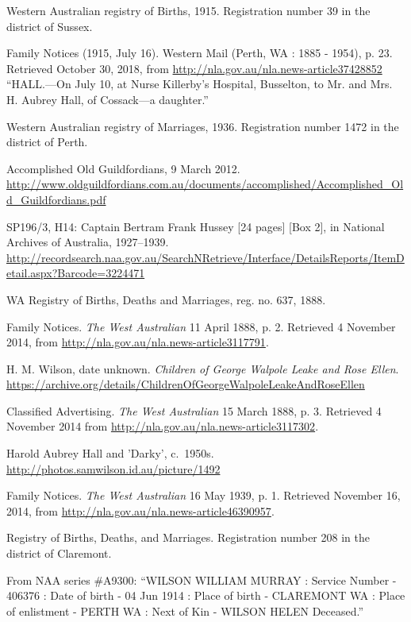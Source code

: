 \begin{thebibliography}{999}
	Western Australian registry of Births, 1915. Registration number 39 in the district of Sussex.

	Family Notices (1915, July 16). Western Mail (Perth, WA : 1885 - 1954), p. 23. Retrieved October 30, 2018, from \url{http://nla.gov.au/nla.news-article37428852}
	``HALL.---On July 10, at Nurse Killerby's Hospital, Busselton, to Mr. and Mrs. H. Aubrey Hall, of Cossack---a daughter.''

	Western Australian registry of Marriages, 1936. Registration number 1472 in the district of Perth.

	Accomplished Old Guildfordians, 9 March 2012.
	\url{http://www.oldguildfordians.com.au/documents/accomplished/Accomplished_Old_Guildfordians.pdf}

	SP196/3, H14: Captain Bertram Frank Hussey [24 pages] [Box 2], in National Archives of Australia, 1927--1939.
	\url{http://recordsearch.naa.gov.au/SearchNRetrieve/Interface/DetailsReports/ItemDetail.aspx?Barcode=3224471}

	WA Registry of Births, Deaths and Marriages, reg. no. 637, 1888.

	Family Notices. \emph{The West Australian} 11 April 1888, p. 2. Retrieved 4 November 2014,
	from \url{http://nla.gov.au/nla.news-article3117791}.

	H. M. Wilson, date unknown. \emph{Children of George Walpole Leake and Rose Ellen}.
	\url{https://archive.org/details/ChildrenOfGeorgeWalpoleLeakeAndRoseEllen}

	Classified Advertising. \emph{The West Australian} 15 March 1888, p. 3.
	Retrieved 4 November 2014 from \url{http://nla.gov.au/nla.news-article3117302}.

	Harold Aubrey Hall and 'Darky', c.\ 1950s.
	\url{http://photos.samwilson.id.au/picture/1492}

	Family Notices. \emph{The West Australian} 16 May 1939, p. 1. Retrieved November 16, 2014, from \url{http://nla.gov.au/nla.news-article46390957}.

	Registry of Births, Deaths, and Marriages. Registration number 208 in the district of Claremont.

	From NAA series \#A9300: ``WILSON WILLIAM MURRAY : Service Number - 406376
	: Date of birth - 04 Jun 1914 : Place of birth - CLAREMONT WA
	: Place of enlistment - PERTH WA : Next of Kin - WILSON HELEN Deceased.''


\end{thebibliography}
